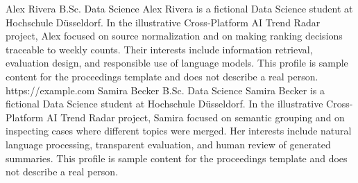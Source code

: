 \ResetPaperMetadata
{}
\PaperEmail{}

\AddAuthor
  {Alex Rivera}
  {B.Sc. Data Science}
  {Alex Rivera is a fictional Data Science student at Hochschule D\"usseldorf. In the illustrative Cross-Platform AI Trend Radar project, Alex focused on source normalization and on making ranking decisions traceable to weekly counts. Their interests include information retrieval, evaluation design, and responsible use of language models. This profile is sample content for the proceedings template and does not describe a real person.}
  {}
  {}
  {}
  {https://example.com} %
\AddAuthor
  {Samira Becker}
  {B.Sc. Data Science}
  {Samira Becker is a fictional Data Science student at Hochschule D\"usseldorf. In the illustrative Cross-Platform AI Trend Radar project, Samira focused on semantic grouping and on inspecting cases where different topics were merged. Her interests include natural language processing, transparent evaluation, and human review of generated summaries. This profile is sample content for the proceedings template and does not describe a real person.}
  {}
  {}
  {}
  {}

